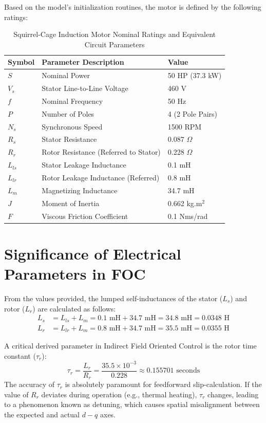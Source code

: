 \documentclass[12pt,a4paper]{report}
\begin{document}
Based on the model's initialization routines, the motor is defined by the following ratings:
\begin{table}[H]
\centering
\caption{Squirrel-Cage Induction Motor Nominal Ratings and Equivalent Circuit Parameters}
\begin{tabular}{|p{3cm}|p{8cm}|p{4cm}|}
\hline
\textbf{Symbol} & \textbf{Parameter Description} & \textbf{Value} \\ \hline
$S$ & Nominal Power & 50 HP (37.3 kW) \\ \hline
$V_{s}$ & Stator Line-to-Line Voltage & 460 V \\ \hline
$f$ & Nominal Frequency & 50 Hz \\ \hline
$P$ & Number of Poles & 4 (2 Pole Pairs) \\ \hline
$N_{s}$ & Synchronous Speed & 1500 RPM \\ \hline
$R_{s}$ & Stator Resistance & 0.087 $\Omega$ \\ \hline
$R_{r}$ & Rotor Resistance (Referred to Stator) & 0.228 $\Omega$ \\ \hline
$L_{ls}$ & Stator Leakage Inductance & 0.1 mH \\ \hline
$L_{lr}$ & Rotor Leakage Inductance (Referred) & 0.8 mH \\ \hline
$L_{m}$ & Magnetizing Inductance & 34.7 mH \\ \hline
$J$ & Moment of Inertia & 0.662 kg.m$^2$ \\ \hline
$F$ & Viscous Friction Coefficient & 0.1 Nms/rad \\ \hline
\end{tabular}
\end{table}

\section{Significance of Electrical Parameters in FOC}
From the values provided, the lumped self-inductances of the stator ($L_s$) and rotor ($L_r$) are calculated as follows:
\begin{align}
L_{s} &= L_{ls} + L_{m} = 0.1 \text{ mH} + 34.7 \text{ mH} = 34.8 \text{ mH} = 0.0348 \text{ H} \\
L_{r} &= L_{lr} + L_{m} = 0.8 \text{ mH} + 34.7 \text{ mH} = 35.5 \text{ mH} = 0.0355 \text{ H}
\end{align}

A critical derived parameter in Indirect Field Oriented Control is the rotor time constant ($\tau_r$):
\begin{equation}
\tau_{r} = \frac{L_{r}}{R_{r}} = \frac{35.5 \times 10^{-3}}{0.228} \approx 0.155701 \text{ seconds}
\end{equation}
The accuracy of $\tau_{r}$ is absolutely paramount for feedforward slip-calculation. If the value of $R_{r}$ deviates during operation (e.g., thermal heating), $\tau_{r}$ changes, leading to a phenomenon known as detuning, which causes spatial misalignment between the expected and actual $d-q$ axes.
\end{document}

